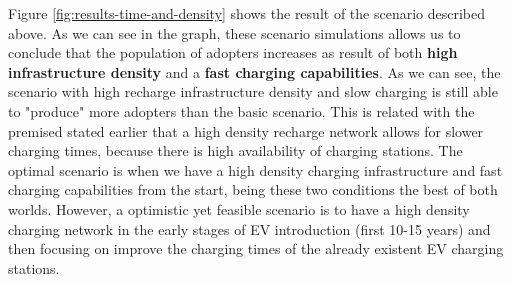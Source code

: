 Figure \ref{fig:results-time-and-density} shows the result of the scenario described above. As we can see in the graph, these scenario simulations allows us to conclude that the population of adopters increases as result of both \textbf{high infrastructure density} and a \textbf{fast charging capabilities}. As we can see, the scenario with high recharge infrastructure density and slow charging is still able to "produce" more adopters than the basic scenario. This is related with the premised stated earlier that a high density recharge network allows for slower charging times, because there is high availability of charging stations. The optimal scenario is when we have a high density charging infrastructure and fast charging capabilities from the start, being these two conditions the best of both worlds. However, a optimistic yet feasible scenario is to have a high density charging network in the early stages of EV introduction (first 10-15 years) and then focusing on improve the charging times of the already existent EV charging stations.

\clearpage
